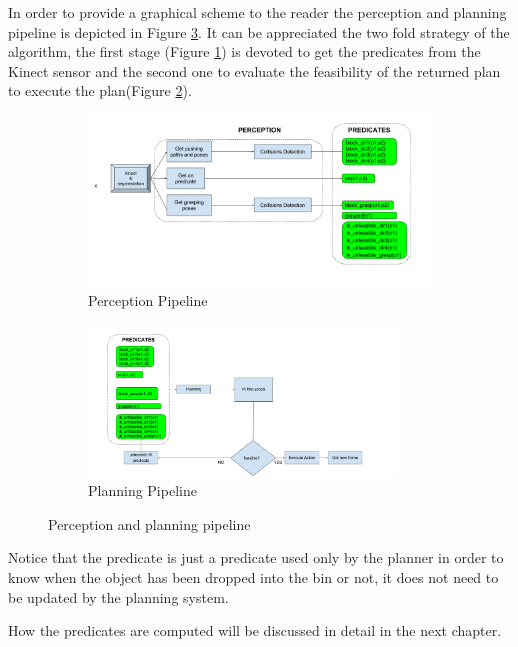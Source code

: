 In order to provide a graphical scheme to the reader the perception and planning pipeline is depicted in Figure \ref{fig:pipeline}. It can be appreciated the two fold strategy of the algorithm, the first stage (Figure \ref{fig:pipeline1}) is devoted to get the predicates from the Kinect sensor and the second one to evaluate the feasibility of the returned plan to execute the plan(Figure \ref{fig:pipeline2}).

\begin{figure}[t]
\centering
\begin{subfigure}[t]{\textwidth}
\centering
\includegraphics[width=\textwidth]{Img/planning/Pipeline1.png}
\caption{Perception Pipeline}\label{fig:pipeline1}
\end{subfigure}
\begin{subfigure}[t]{\textwidth}
\centering
\includegraphics[width=0.9\textwidth]{Img/planning/Pipeline2.png}
\caption{Planning Pipeline}\label{fig:pipeline2}
\end{subfigure}
\caption{Perception and planning pipeline}\label{fig:pipeline}
\end{figure}

Notice that the  predicate is just a predicate used only by the planner in order to know when the object has been dropped into the bin or not, it does not need to be updated by the planning system. 

\mbox{}

How the predicates are computed will be discussed in detail in the next chapter.



